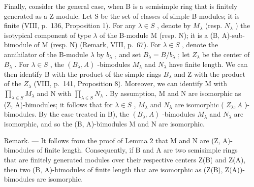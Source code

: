 \begin{enumerate}
  Finally, consider the general case, when B is a semisimple ring that is finitely generated as a Z-module. Let S be the set of classes of simple B-modules; it is finite (VIII, p.~136, Proposition 1). For any \(\lambda \in S\) , denote by \(M_{\lambda}\) (resp. \(N_{\lambda}\) ) the isotypical component of type \(\lambda\) of the B-module M (resp. N); it is a (B, A)-sub-bimodule of M (resp. N) (Remark, VIII, p.~67). For \(\lambda \in S\) , denote the annihilator of the B-module \(\lambda\) by \(b_{\lambda}\) , and set \(B_{\lambda} = B / b_{\lambda}\) ; let \(Z_{\lambda}\) be the center of \(B_{\lambda}\) . For \(\lambda \in S\) , the \((B_{\lambda}, A)\) -bimodules \(M_{\lambda}\) and \(N_{\lambda}\) have finite length. We can then identify B with the product of the simple rings \(B_{\lambda}\) and Z with the product of the \(Z_{\lambda}\) (VIII, p.~141, Proposition 8). Moreover, we can identify M with \(\prod_{\lambda \in S} M_{\lambda}\) and N with \(\prod_{\lambda \in S} N_{\lambda}\) . By assumption, M and N are isomorphic as (Z, A)-bimodules; it follows that for \(\lambda \in S\) , \(M_{\lambda}\) and \(N_{\lambda}\) are isomorphic ( \(Z_{\lambda}, A\) )-bimodules. By the case treated in B), the \((B_{\lambda}, A)\) -bimodules \(M_{\lambda}\) and \(N_{\lambda}\) are isomorphic, and so the (B, A)-bimodules M and N are isomorphic.
\end{enumerate}

Remark. --- It follows from the proof of Lemma 2 that M and N are (Z, A)-bimodules of finite length. Consequently, if B and A are two semisimple rings that are finitely generated modules over their respective centers Z(B) and Z(A), then two (B, A)-bimodules of finite length that are isomorphic as (Z(B), Z(A))-bimodules are isomorphic.
\relax{}
